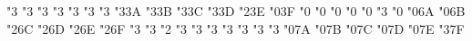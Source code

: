 {  \mathchardef\nVDash            "3\hex{}
  \mathchardef\ntrianglerighteq  "3\hex{}
  \mathchardef\ntrianglelefteq   "3\hex{}
  \mathchardef\ntriangleleft     "3\hex{}
  \mathchardef\ntriangleright    "3\hex{}
  \mathchardef\nleftarrow        "3\hex{}
  \mathchardef\nrightarrow       "3\hex{}
  \mathchardef\nLeftarrow        "3\hex\msbmfam 3A
  \mathchardef\nRightarrow       "3\hex\msbmfam 3B
  \mathchardef\nLeftrightarrow   "3\hex\msbmfam 3C
  \mathchardef\nleftrightarrow   "3\hex\msbmfam 3D
  \mathchardef\divideontimes     "2\hex\msbmfam 3E
  \mathchardef\varnothing        "0\hex\msbmfam 3F
  \mathchardef\nexists           "0\hex{}
  \mathchardef\Finv              "0\hex{}
  \mathchardef\Game              "0\hex{}
  \mathchardef\mho               "0\hex{}
  \mathchardef\eth               "0\hex{}
  \mathchardef\eqsim             "3\hex{}
  \mathchardef\beth              "0\hex{}
  \mathchardef\gimel             "0\hex\msbmfam 6A
  \mathchardef\daleth            "0\hex\msbmfam 6B
  \mathchardef\lessdot           "2\hex\msbmfam 6C
  \mathchardef\gtrdot            "2\hex\msbmfam 6D
  \mathchardef\ltimes            "2\hex\msbmfam 6E
  \mathchardef\rtimes            "2\hex\msbmfam 6F
  \mathchardef\shortmid          "3\hex{}
  \mathchardef\shortparallel     "3\hex{}
  \mathchardef\smallsetminus     "2\hex{}
  \mathchardef\thicksim          "3\hex{}
  \mathchardef\thickapprox       "3\hex{}
  \mathchardef\approxeq          "3\hex{}
  \mathchardef\succapprox        "3\hex{}
  \mathchardef\precapprox        "3\hex{}
  \mathchardef\curvearrowleft    "3\hex{}
  \mathchardef\curvearrowright   "3\hex{}
  \mathchardef\digamma           "0\hex\msbmfam 7A
  \mathchardef\varkappa          "0\hex\msbmfam 7B
  \mathchardef\Bbbk              "0\hex\msbmfam 7C
  \mathchardef\hslash            "0\hex\msbmfam 7D
  \mathchardef\hbar              "0\hex\msbmfam 7E
  \mathchardef\backepsilon       "3\hex\msbmfam 7F
}


